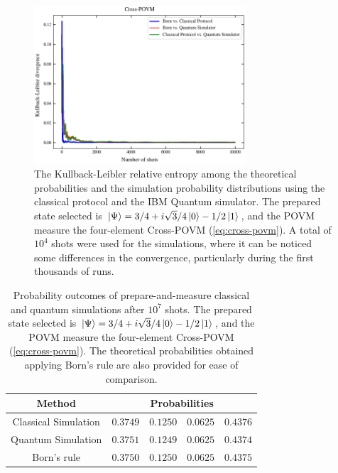 \begin{figure}[h!]
\centering
\includegraphics[width=0.7\textwidth]{images/pm_povm_kl_bcq.png}
\caption{The Kullback-Leibler relative entropy among the theoretical probabilities and the simulation probability distributions using the classical protocol and the IBM Quantum simulator. The prepared state selected is $\ket{\Psi}=3/4 + i \sqrt{3}/4 \ket{0} - 1/2 \ket{1}$, and the POVM measure the four-element Cross-POVM (\ref{eq:cross-povm}). A total of $10^4$ shots were used for the simulations, where it can be noticed some differences in the convergence, particularly during the first thousands of runs.}
\label{fig:classical_quantum_results_kl}
\end{figure}

\begin{table}[h!]
\centering
{\renewcommand{\arraystretch}{1.2}%
\begin{tabular}{c c c c c} 
 \toprule
 Method & \multicolumn{4}{c}{Probabilities}  \\ \hline
 Classical Simulation   & $\scriptstyle0.3749$ 
                        & $\scriptstyle0.1250$ 
                        & $\scriptstyle0.0625$ 
                        & $\scriptstyle0.4376$ \\ \hline 
 Quantum Simulation     & $\scriptstyle0.3751$ 
                        & $\scriptstyle0.1249$ 
                        & $\scriptstyle0.0625$ 
                        & $\scriptstyle0.4374$ \\ \hline
 Born's rule            & $\scriptstyle0.3750$ 
                        & $\scriptstyle0.1250$ 
                        & $\scriptstyle0.0625$ 
                        & $\scriptstyle0.4375$ \\ 
 \bottomrule
\end{tabular}}
\caption{Probability outcomes of prepare-and-measure classical and quantum simulations after $10^{7}$ shots. The prepared state selected is $\ket{\Psi}=3/4 + i \sqrt{3}/4 \ket{0} - 1/2 \ket{1}$, and the POVM measure the four-element Cross-POVM (\ref{eq:cross-povm}). The theoretical probabilities obtained applying Born’s rule are also
provided for ease of comparison.}
\label{table:classical_quantum_results}
\end{table}

